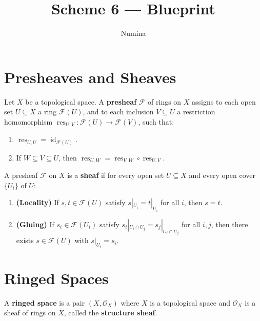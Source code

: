 \documentclass[a4paper]{article}
\title{Scheme 6 --- Blueprint}
\author{Numina}
\date{}
\begin{document}
\maketitle

\section{Presheaves and Sheaves}

\begin{definition}[Presheaf]
    \label{def:presheaf}
    \leanok
    Let $X$ be a topological space. A \textbf{presheaf} $\mathcal{F}$ of rings on $X$ assigns to each open set $U \subseteq X$ a ring $\mathcal{F}(U)$, and to each inclusion $V \subseteq U$ a restriction homomorphism $\operatorname{res}_{U,V} \colon \mathcal{F}(U) \to \mathcal{F}(V)$, such that:
    \begin{enumerate}
        \item $\operatorname{res}_{U,U} = \operatorname{id}_{\mathcal{F}(U)}$.
        \item If $W \subseteq V \subseteq U$, then $\operatorname{res}_{U,W} = \operatorname{res}_{V,W} \circ \operatorname{res}_{U,V}$.
    \end{enumerate}
\end{definition}

\begin{definition}[Sheaf]
    \label{def:sheaf}
    \leanok
    A presheaf $\mathcal{F}$ on $X$ is a \textbf{sheaf} if for every open set $U \subseteq X$ and every open cover $\{U_i\}$ of $U$:
    \begin{enumerate}
        \item \textbf{(Locality)} If $s, t \in \mathcal{F}(U)$ satisfy $s|_{U_i} = t|_{U_i}$ for all $i$, then $s = t$.
        \item \textbf{(Gluing)} If $s_i \in \mathcal{F}(U_i)$ satisfy $s_i|_{U_i \cap U_j} = s_j|_{U_i \cap U_j}$ for all $i, j$, then there exists $s \in \mathcal{F}(U)$ with $s|_{U_i} = s_i$.
    \end{enumerate}
\end{definition}

\section{Ringed Spaces}

\begin{definition}
    \label{def:ringed_space}
    \leanok
    A \textbf{ringed space} is a pair $(X, \mathcal{O}_X)$ where $X$ is a topological space and $\mathcal{O}_X$ is a sheaf of rings on $X$, called the \textbf{structure sheaf}.
\end{definition}
\end{document}
